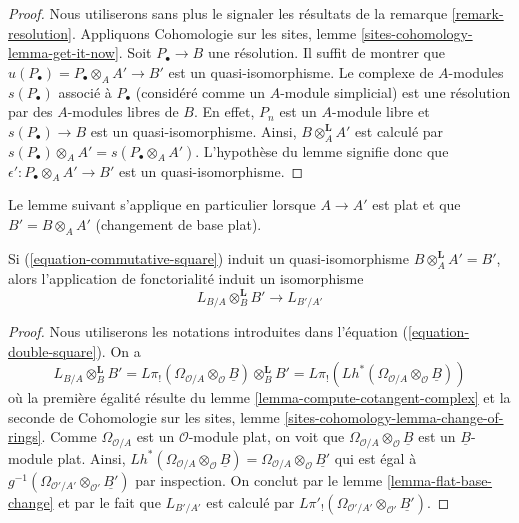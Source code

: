\begin{proof}
Nous utiliserons sans plus le signaler les résultats de la remarque
\ref{remark-resolution}. Appliquons Cohomologie sur les sites, lemme
\ref{sites-cohomology-lemma-get-it-now}. Soit $P_\bullet \to B$ une
résolution. Il suffit de montrer que
$u(P_\bullet) = P_\bullet \otimes_A A' \to B'$ est un quasi-isomorphisme. Le
complexe de $A$-modules $s(P_\bullet)$ associé à $P_\bullet$ (considéré comme
un $A$-module simplicial) est une résolution par des $A$-modules libres de
$B$. En effet, $P_n$ est un $A$-module libre et
$s(P_\bullet) \to B$ est un quasi-isomorphisme. Ainsi,
$B \otimes_A^\mathbf{L} A'$ est calculé par
$s(P_\bullet) \otimes_A A' = s(P_\bullet \otimes_A A')$. L'hypothèse du
lemme signifie donc que $\epsilon' : P_\bullet \otimes_A A' \to B'$ est un
quasi-isomorphisme.
\end{proof}

\noindent
Le lemme suivant s'applique en particulier lorsque $A \to A'$ est plat et que
$B' = B \otimes_A A'$ (changement de base plat).

\begin{lemma}
\label{lemma-flat-base-change-cotangent-complex}
Si (\ref{equation-commutative-square}) induit un quasi-isomorphisme
$B \otimes_A^\mathbf{L} A' = B'$, alors l'application de fonctorialité induit
un isomorphisme
$$
L_{B/A} \otimes_B^\mathbf{L} B' \longrightarrow L_{B'/A'}
$$
\end{lemma}

\begin{proof}
Nous utiliserons les notations introduites dans l'équation
(\ref{equation-double-square}). On a
$$
L_{B/A} \otimes_B^\mathbf{L} B' =
L\pi_!(\Omega_{\mathcal{O}/A} \otimes_\mathcal{O} \underline{B})
\otimes_B^\mathbf{L} B' =
L\pi_!(Lh^*(\Omega_{\mathcal{O}/A} \otimes_\mathcal{O} \underline{B}))
$$
où la première égalité résulte du lemme
\ref{lemma-compute-cotangent-complex} et la seconde de Cohomologie sur les
sites, lemme \ref{sites-cohomology-lemma-change-of-rings}. Comme
$\Omega_{\mathcal{O}/A}$ est un $\mathcal{O}$-module plat, on voit que
$\Omega_{\mathcal{O}/A} \otimes_\mathcal{O} \underline{B}$ est un
$\underline{B}$-module plat. Ainsi,
$Lh^*(\Omega_{\mathcal{O}/A} \otimes_\mathcal{O} \underline{B}) =
\Omega_{\mathcal{O}/A} \otimes_\mathcal{O} \underline{B'}$
qui est égal à
$g^{-1}(\Omega_{\mathcal{O}'/A'} \otimes_{\mathcal{O}'} \underline{B'})$
par inspection. On conclut par le lemme \ref{lemma-flat-base-change} et par le
fait que $L_{B'/A'}$ est calculé par
$L\pi'_!(\Omega_{\mathcal{O}'/A'} \otimes_{\mathcal{O}'} \underline{B'})$.
\end{proof}

